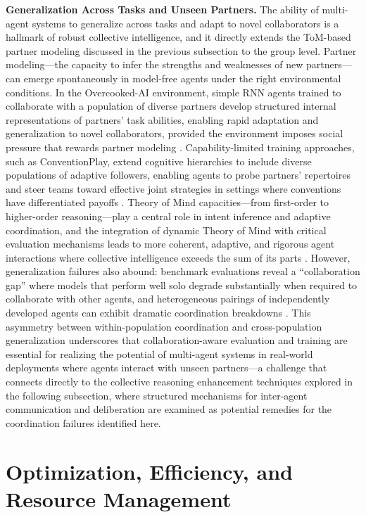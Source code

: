 \documentclass[11pt]{article}
\begin{document}
\textbf{Generalization Across Tasks and Unseen Partners.} The ability of multi-agent systems to generalize across tasks and adapt to novel collaborators is a hallmark of robust collective intelligence, and it directly extends the ToM-based partner modeling discussed in the previous subsection to the group level. Partner modeling---the capacity to infer the strengths and weaknesses of new partners---can emerge spontaneously in model-free agents under the right environmental conditions. In the Overcooked-AI environment, simple RNN agents trained to collaborate with a population of diverse partners develop structured internal representations of partners' task abilities, enabling rapid adaptation and generalization to novel collaborators, provided the environment imposes social pressure that rewards partner modeling \cite{ref260}. Capability-limited training approaches, such as ConventionPlay, extend cognitive hierarchies to include diverse populations of adaptive followers, enabling agents to probe partners' repertoires and steer teams toward effective joint strategies in settings where conventions have differentiated payoffs \cite{ref261}. Theory of Mind capacities---from first-order to higher-order reasoning---play a central role in intent inference and adaptive coordination, and the integration of dynamic Theory of Mind with critical evaluation mechanisms leads to more coherent, adaptive, and rigorous agent interactions where collective intelligence exceeds the sum of its parts \cite{ref25}. However, generalization failures also abound: benchmark evaluations reveal a ``collaboration gap'' where models that perform well solo degrade substantially when required to collaborate with other agents, and heterogeneous pairings of independently developed agents can exhibit dramatic coordination breakdowns \cite{ref262}. This asymmetry between within-population coordination and cross-population generalization underscores that collaboration-aware evaluation and training are essential for realizing the potential of multi-agent systems in real-world deployments where agents interact with unseen partners---a challenge that connects directly to the collective reasoning enhancement techniques explored in the following subsection, where structured mechanisms for inter-agent communication and deliberation are examined as potential remedies for the coordination failures identified here.

\section{Optimization, Efficiency, and Resource Management}
\end{document}
